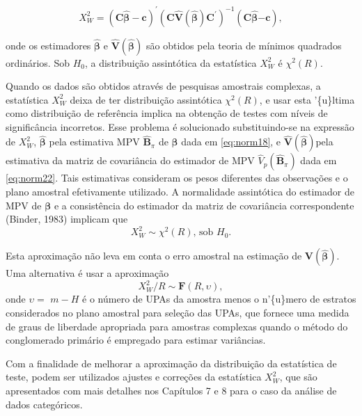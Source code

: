 \documentclass[]{book}
\begin{document}
\begin{equation}
X_{W}^{2}=\left( \mathbf{C}\widehat{\mathbf{\beta }}-\mathbf{c}\right)
^{\prime }\left( \mathbf{C}\widehat{\mathbf{V}}\left( \mathbf{\hat{\beta}}
\right) \mathbf{C}^{\prime }\right) ^{-1}\left( \mathbf{C}\widehat{\mathbf{
\beta }}\mathbf{-c}\right),  \label{eq:norm31}
\end{equation}

onde os estimadores \(\widehat{\mathbf{\beta }}\) e
\(\widehat{\mathbf{V}}\left( \mathbf{\hat{\beta}}\right)\) são obtidos
pela teoria de mínimos quadrados ordinários. Sob \(H_{0}\), a
distribuição assintótica da estatística \(X_{W}^{2}\) é
\(\chi ^{2}\left(R\right)\).

Quando os dados são obtidos através de pesquisas amostrais complexas, a
estatística \(X_{W}^{2}\) deixa de ter distribuição assintótica
\(\chi ^{2}\left( R\right)\), e usar esta '\{u\}ltima como distribuição
de referência implica na obtenção de testes com níveis de significância
incorretos. Esse problema é solucionado substituindo-se na expressão de
\(X_{W}^{2}\), \(\mathbf{\hat{\beta}}\) pela estimativa MPV
\(\widehat{\mathbf{B}}_{\pi }\) de \(\mathbf{\beta}\) dada em
\eqref{eq:norm18}, e
\(\widehat{\mathbf{V}}\left( \mathbf{\hat{\beta}}\right)\)pela
estimativa da matriz de covariância do estimador de MPV
\(\hat{V}_{p}\left( \widehat{\mathbf{B}}_{\pi }\right)\) dada em
\eqref{eq:norm22}. Tais estimativas consideram os pesos diferentes das
observações e o plano amostral efetivamente utilizado. A normalidade
assintótica do estimador de MPV de \(\mathbf{\beta}\) e a consistência
do estimador da matriz de covariância correspondente (Binder, 1983)
implicam que \[
X_{W}^{2}\sim \chi^{2}\left( R\right)\mbox{, sob }H_{0}.
\]

Esta aproximação não leva em conta o erro amostral na estimação de
\(\mathbf{V}\left( \mathbf{\hat{\beta}}\right) .\) Uma alternativa é
usar a aproximação \[
X_{W}^{2}/R\sim \mathbf{F}(R,\upsilon),
\] onde \(\upsilon =\) \(m-H\) é o número de UPAs da amostra menos o
n'\{u\}mero de estratos considerados no plano amostral para seleção das
UPAs, que fornece uma medida de graus de liberdade apropriada para
amostras complexas quando o método do conglomerado primário é empregado
para estimar variâncias.

Com a finalidade de melhorar a aproximação da distribuição da
estatística de teste, podem ser utilizados ajustes e correções da
estatística \(X_{W}^{2}\), que são apresentados com mais detalhes nos
Capítulos 7 e 8 para o caso da análise de dados categóricos.
\end{document}
